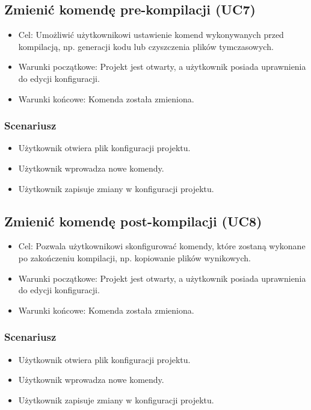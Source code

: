 \subsection{Zmienić komendę pre-kompilacji (UC7)}
\begin{itemize}
    \item Cel: Umożliwić użytkownikowi ustawienie komend wykonywanych przed kompilacją, np. generacji kodu lub czyszczenia plików tymczasowych.
    \item Warunki początkowe: Projekt jest otwarty, a użytkownik posiada uprawnienia do edycji konfiguracji.
    \item Warunki końcowe: Komenda została zmieniona.
\end{itemize}

\subsubsection{Scenariusz}
\begin{itemize}
    \item Użytkownik otwiera plik konfiguracji projektu.
    \item Użytkownik wprowadza nowe komendy.
    \item Użytkownik zapisuje zmiany w konfiguracji projektu.
\end{itemize}

\subsection{Zmienić komendę post-kompilacji (UC8)}
\begin{itemize}
    \item Cel: Pozwala użytkownikowi skonfigurować komendy, które zostaną wykonane po zakończeniu kompilacji, np. kopiowanie plików wynikowych.
    \item Warunki początkowe: Projekt jest otwarty, a użytkownik posiada uprawnienia do edycji konfiguracji.
    \item Warunki końcowe: Komenda została zmieniona.
\end{itemize}

\subsubsection{Scenariusz}
\begin{itemize}
    \item Użytkownik otwiera plik konfiguracji projektu.
    \item Użytkownik wprowadza nowe komendy.
    \item Użytkownik zapisuje zmiany w konfiguracji projektu.
\end{itemize}

